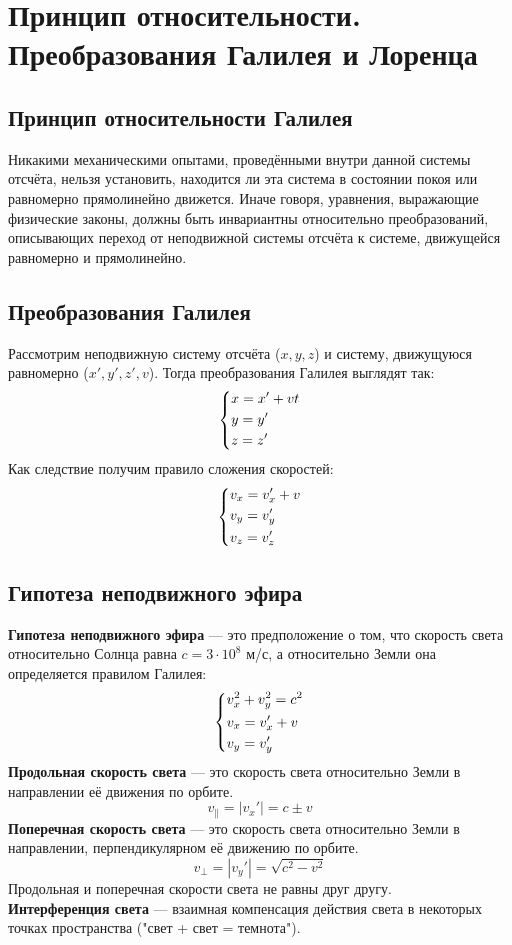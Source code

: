 \documentclass[fleqn,a4paper,12pt,titlepage,finall]{article}
\begin{document}
\section{Принцип относительности. Преобразования Галилея и Лоренца}
\subsection{Принцип относительности Галилея}
Никакими механическими опытами, проведёнными внутри данной системы отсчёта,
нельзя установить, находится ли эта система в состоянии покоя или равномерно
прямолинейно движется. Иначе говоря, уравнения, выражающие физические законы,
должны быть инвариантны относительно преобразований, описывающих переход от
неподвижной системы отсчёта к системе, движущейся равномерно и прямолинейно. 
\subsection{Преобразования Галилея}
Рассмотрим неподвижную систему отсчёта ($x, y, z$) и систему, движущуюся
равномерно ($x', y', z', v$). Тогда преобразования Галилея выглядят так:
\[\begin{dcases}
	x = x' + vt \\
	y = y' \\
	z = z' \\
\end{dcases}\]
Как следствие получим правило сложения скоростей:
\[\begin{dcases}
	v_x = v_x' + v \\
	v_y = v_y' \\
	v_z = v_z' \\
\end{dcases}\]
\subsection{Гипотеза неподвижного эфира}
{\bf Гипотеза неподвижного эфира} --- это предположение о том, что скорость
света относительно Солнца равна $c = 3\cdot10^8$ м/с, а относительно Земли она
определяется правилом Галилея:
\[\begin{dcases}
	v_x^2 + v_y^2 = c^2 \\
	v_x = v_x' + v \\
	v_y = v_y' \\
\end{dcases}\]
{\bf Продольная скорость света} --- это скорость света относительно Земли в
направлении её движения по орбите.
\[v_{\parallel} = |v_x'| = c \pm v\]
{\bf Поперечная скорость света} --- это скорость света относительно Земли в
направлении, перпендикулярном её движению по орбите.
\[v_{\perp} = |v_y'| = \sqrt{c^2-v^2}\]
Продольная и поперечная скорости света не равны друг другу.\\
{\bf Интерференция света} --- взаимная компенсация действия света в некоторых
точках пространства ("свет + свет  = темнота"). \\
\end{document}
